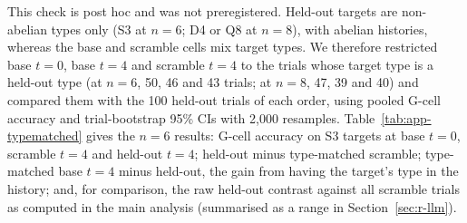 \documentclass[11pt]{article}
\begin{document}
This check is post hoc and was not preregistered. Held-out targets are non-abelian types only (S3 at $n = 6$; D4 or Q8 at $n = 8$), with abelian histories, whereas the base and scramble cells mix target types. We therefore restricted base $t = 0$, base $t = 4$ and scramble $t = 4$ to the trials whose target type is a held-out type (at $n = 6$, 50, 46 and 43 trials; at $n = 8$, 47, 39 and 40) and compared them with the 100 held-out trials of each order, using pooled G-cell accuracy and trial-bootstrap 95\% CIs with 2,000 resamples. Table~\ref{tab:app-typematched} gives the $n = 6$ results: G-cell accuracy on S3 targets at base $t = 0$, scramble $t = 4$ and held-out $t = 4$; held-out minus type-matched scramble; type-matched base $t = 4$ minus held-out, the gain from having the target's type in the history; and, for comparison, the raw held-out contrast against all scramble trials as computed in the main analysis (summarised as a range in Section~\ref{sec:r-llm}).
\end{document}
